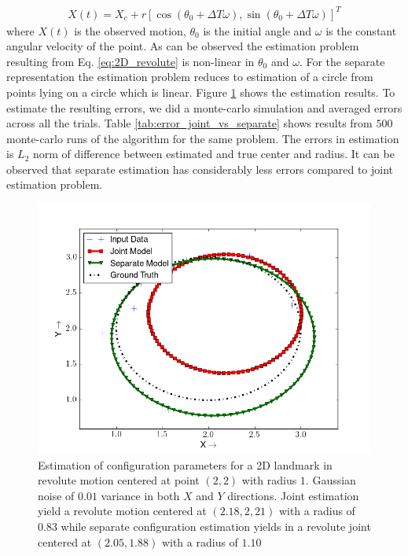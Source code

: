 \documentclass[conference]{IEEEtran}
\begin{document}
\begin{align}
X(t) = X_c+r[\cos(\theta_0+\Delta T \omega),\sin(\theta_0+\Delta T \omega)]^T \label{eq:2D_revolute}
\end{align}
where $X(t)$ is the observed motion, $\theta_0$ is the initial angle and $\omega$ is the constant angular velocity of the point. As can be observed the estimation problem resulting from Eq. \ref{eq:2D_revolute} is non-linear in $\theta_0$ and $\omega$. For the separate representation the estimation problem reduces to estimation of a circle from points lying on a circle which is linear. Figure \ref{fig:joint_vs_separate_estimation} shows the estimation results. To estimate the resulting errors, we did a monte-carlo simulation and averaged errors across all the trials. Table \ref{tab:error_joint_vs_separate} shows results from $500$ monte-carlo runs of the algorithm for the same problem. The errors in estimation is $L_2$ norm of difference between estimated and true center and radius. It can be observed that separate estimation has considerably less errors compared to joint estimation problem.

\begin{figure}
\includegraphics[width=1\linewidth]{figures/joint_vs_separate.png}
\caption{Estimation of configuration parameters for a 2D landmark in revolute motion centered at point $(2,2)$ with radius $1$. Gaussian noise of  $0.01$ variance in both $X$ and $Y$ directions. Joint estimation yield a revolute motion centered at $(2.18,2,21)$ with a radius of $0.83$ while separate configuration estimation yields in a revolute joint centered at $(2.05,1.88)$ with a radius of $1.10$}
\label{fig:joint_vs_separate_estimation}
\end{figure}
\end{document}
